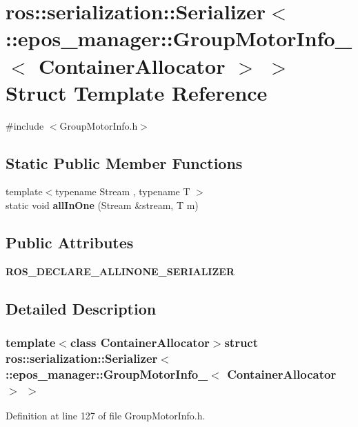 \section{ros\-:\-:serialization\-:\-:\-Serializer$<$ \-:\-:epos\-\_\-manager\-:\-:\-Group\-Motor\-Info\-\_\-$<$ \-Container\-Allocator $>$ $>$ \-Struct \-Template \-Reference}
\label{structros_1_1serialization_1_1Serializer_3_01_1_1epos__manager_1_1GroupMotorInfo___3_01ContainerAllocator_01_4_01_4}


{\ttfamily \#include $<$\-Group\-Motor\-Info.\-h$>$}

\subsection*{\-Static \-Public \-Member \-Functions}
\begin{DoxyCompactItemize}
\item 
{\footnotesize template$<$typename Stream , typename T $>$ }\\static void {\bf all\-In\-One} (\-Stream \&stream, \-T m)
\end{DoxyCompactItemize}
\subsection*{\-Public \-Attributes}
\begin{DoxyCompactItemize}
\item 
{\bf \-R\-O\-S\-\_\-\-D\-E\-C\-L\-A\-R\-E\-\_\-\-A\-L\-L\-I\-N\-O\-N\-E\-\_\-\-S\-E\-R\-I\-A\-L\-I\-Z\-E\-R}
\end{DoxyCompactItemize}


\subsection{\-Detailed \-Description}
\subsubsection*{template$<$class Container\-Allocator$>$struct ros\-::serialization\-::\-Serializer$<$ \-::epos\-\_\-manager\-::\-Group\-Motor\-Info\-\_\-$<$ Container\-Allocator $>$ $>$}



\-Definition at line 127 of file \-Group\-Motor\-Info.\-h.



